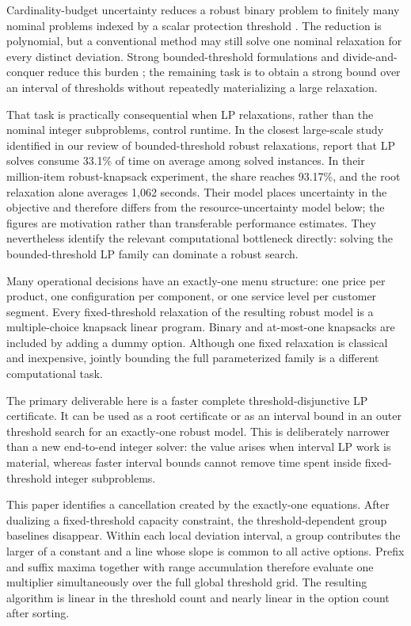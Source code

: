 \documentclass[11pt]{article}
\theoremstyle{plain}
\theoremstyle{definition}
\theoremstyle{remark}
\begin{document}
Cardinality-budget uncertainty reduces a robust binary problem to finitely many nominal problems indexed by a scalar protection threshold \citep{BertsimasSim2003,BertsimasSim2004}.  The reduction is polynomial, but a conventional method may still solve one nominal relaxation for every distinct deviation.  Strong bounded-threshold formulations and divide-and-conquer reduce this burden \citep{AlvarezMiranda2013,Hansknecht2018,BusingGersingKoster2023}; the remaining task is to obtain a strong bound over an interval of thresholds without repeatedly materializing a large relaxation.

That task is practically consequential when LP relaxations, rather than the nominal integer subproblems, control runtime.  In the closest large-scale study identified in our review of bounded-threshold robust relaxations, \citet{BusingGersingKoster2023} report that LP solves consume 33.1\% of time on average among solved instances.  In their million-item robust-knapsack experiment, the share reaches 93.17\%, and the root relaxation alone averages 1,062 seconds.  Their model places uncertainty in the objective and therefore differs from the resource-uncertainty model below; the figures are motivation rather than transferable performance estimates.  They nevertheless identify the relevant computational bottleneck directly: solving the bounded-threshold LP family can dominate a robust search.

Many operational decisions have an exactly-one menu structure: one price per product, one configuration per component, or one service level per customer segment.  Every fixed-threshold relaxation of the resulting robust model is a multiple-choice knapsack linear program.  Binary and at-most-one knapsacks are included by adding a dummy option.  Although one fixed relaxation is classical and inexpensive, jointly bounding the full parameterized family is a different computational task.

The primary deliverable here is a faster complete threshold-disjunctive LP certificate.  It can be used as a root certificate or as an interval bound in an outer threshold search for an exactly-one robust model.  This is deliberately narrower than a new end-to-end integer solver: the value arises when interval LP work is material, whereas faster interval bounds cannot remove time spent inside fixed-threshold integer subproblems.

This paper identifies a cancellation created by the exactly-one equations.  After dualizing a fixed-threshold capacity constraint, the threshold-dependent group baselines disappear.  Within each local deviation interval, a group contributes the larger of a constant and a line whose slope is common to all active options.  Prefix and suffix maxima together with range accumulation therefore evaluate one multiplier simultaneously over the full global threshold grid.  The resulting algorithm is linear in the threshold count and nearly linear in the option count after sorting.
\end{document}
